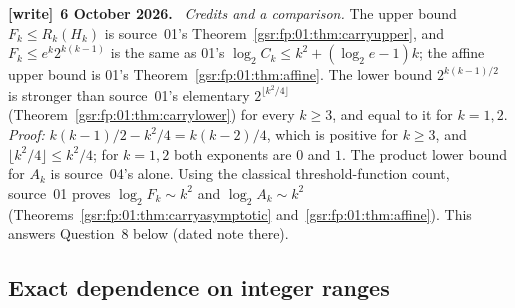 \documentclass[11pt,letterpaper]{article}
\numberwithin{equation}{section}
\theoremstyle{definition}
\theoremstyle{remark}
\newcommand{\1}{\mathbf 1}
\newenvironment{writenote}[1][]{\par\smallskip\begingroup\small
 \noindent\textbf{[write]}\if\relax\detokenize{#1}\relax\else~\textbf{#1.}\fi\ }%
 {\par\endgroup\smallskip}
\begin{document}
\begin{writenote}[6 October 2026]
\emph{Credits and a comparison.} The upper bound $F_k\le R_k(H_k)$ is source~01's Theorem~\ref{gsr:fp:01:thm:carryupper}, and $F_k\le e^k2^{k(k-1)}$ is the same as 01's $\log_2C_k\le k^2+(\log_2e-1)k$; the affine upper bound is 01's Theorem~\ref{gsr:fp:01:thm:affine}. The lower bound $2^{k(k-1)/2}$ is stronger than source~01's elementary $2^{\lfloor k^2/4\rfloor}$ (Theorem~\ref{gsr:fp:01:thm:carrylower}) for every $k\ge3$, and equal to it for $k=1,2$. \emph{Proof:} $k(k-1)/2-k^2/4=k(k-2)/4$, which is positive for $k\ge3$, and $\lfloor k^2/4\rfloor\le k^2/4$; for $k=1,2$ both exponents are $0$ and $1$. The product lower bound for $A_k$ is source~04's alone. Using the classical threshold-function count, source~01 proves $\log_2F_k\sim k^2$ and $\log_2A_k\sim k^2$ (Theorems~\ref{gsr:fp:01:thm:carryasymptotic} and~\ref{gsr:fp:01:thm:affine}). This answers Question~8 below (dated note there).
\end{writenote}

\subsection{Exact dependence on integer ranges}
\end{document}
